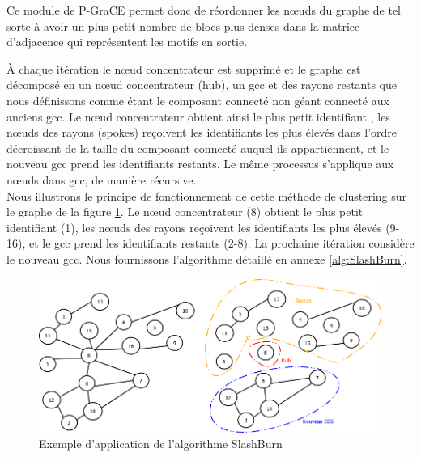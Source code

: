 \documentclass[a4paper,oneside,12pt]{report}
\theoremstyle{definition}
\begin{document}
\begin{enumerate}
Ce module de P-GraCE permet donc de réordonner les nœuds du graphe de tel sorte à avoir un plus petit nombre de blocs plus denses dans la matrice d'adjacence qui représentent les motifs en sortie.  

À chaque itération le nœud concentrateur est supprimé et le graphe est décomposé en un nœud concentrateur (hub), un
\gls{gcc} et des rayons restants que nous définissons comme étant le composant connecté non géant connecté aux anciens \gls{gcc}. Le nœud concentrateur obtient ainsi le plus petit identifiant , les nœuds des rayons (spokes) reçoivent les identifiants les plus élevés  dans l’ordre décroissant de la taille du composant connecté auquel ils appartiennent, et le nouveau \gls{gcc} prend les identifiants restants. Le même processus s'applique aux nœuds dans \gls{gcc}, de manière récursive.\\

Nous illustrons le principe de fonctionnement de cette méthode de clustering sur le graphe de la figure \ref{Img:slashb}. Le nœud concentrateur (8) obtient le plus petit identifiant (1), les nœuds des rayons reçoivent les identifiants les plus élevés (9-16), et le \gls{gcc} prend les identifiants restants (2-8). La prochaine itération considère le nouveau \gls{gcc}. Nous fournissons l'algorithme détaillé en annexe \ref{alg:SlashBurn}.

\begin{figure}[H]
	\centering
	
	\includegraphics[scale=0.25]{ressources/image/slashburn.png}
	\caption{Exemple d'application de l'algorithme SlashBurn}
	\label{Img:slashb}
 \end{figure}


\end{enumerate}
\end{document}
